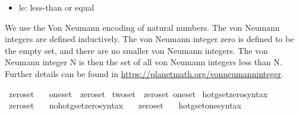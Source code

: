 \begin{isabellebody}
\begin{isamarkuptext}
\begin{itemize}
\item le: less-than or equal%
\end{itemize}%
\end{isamarkuptext}\isamarkuptrue%
%
\begin{isamarkuptext}%
We use the Von Neumann encoding of natural numbers. The von Neumann integers 
are defined inductively. The von Neumann integer zero is defined to be the empty set, 
and there are no smaller von Neumann integers. The von Neumann integer N is then the set of 
all von Neumann integers less than N. Further details can be found in
\url{https://planetmath.org/vonneumanninteger}.%
\end{isamarkuptext}\isamarkuptrue%
\isamarkupfalse%
\ {\isachardoublequoteopen}zero{\isacharunderscore}{\kern0pt}set\ {\isasymequiv}\ {\isacharbraceleft}{\kern0pt}{\isacharbraceright}{\kern0pt}{\isachardoublequoteclose}\isanewline
{}\isamarkupfalse%
\ {\isachardoublequoteopen}one{\isacharunderscore}{\kern0pt}set\ {\isasymequiv}\ {\isacharbraceleft}{\kern0pt}zero{\isacharunderscore}{\kern0pt}set{\isacharbraceright}{\kern0pt}{\isachardoublequoteclose}\isanewline
{}\isamarkupfalse%
\ {\isachardoublequoteopen}two{\isacharunderscore}{\kern0pt}set\ {\isasymequiv}\ {\isacharbraceleft}{\kern0pt}zero{\isacharunderscore}{\kern0pt}set{\isacharcomma}{\kern0pt}\ one{\isacharunderscore}{\kern0pt}set{\isacharbraceright}{\kern0pt}{\isachardoublequoteclose}\isanewline
\isanewline
{}\isamarkupfalse%
\ hotg{\isacharunderscore}{\kern0pt}set{\isacharunderscore}{\kern0pt}zero{\isacharunderscore}{\kern0pt}syntax\ \ \isamarkupfalse%
\ zero{\isacharunderscore}{\kern0pt}set\ {\isacharparenleft}{\kern0pt}{\isachardoublequoteopen}{}{\isachardoublequoteclose}{\isacharparenright}{\kern0pt}\ \isamarkupfalse%
\isanewline
{}\isamarkupfalse%
\ no{\isacharunderscore}{\kern0pt}hotg{\isacharunderscore}{\kern0pt}set{\isacharunderscore}{\kern0pt}zero{\isacharunderscore}{\kern0pt}syntax\ \ \isamarkupfalse%
\ zero{\isacharunderscore}{\kern0pt}set\ {\isacharparenleft}{\kern0pt}{\isachardoublequoteopen}{}{\isachardoublequoteclose}{\isacharparenright}{\kern0pt}\ \isamarkupfalse%
\isanewline
\isanewline
{}\isamarkupfalse%
\ hotg{\isacharunderscore}{\kern0pt}set{\isacharunderscore}{\kern0pt}one{\isacharunderscore}{\kern0pt}syntax\ \ \isamarkupfalse%

\end{isabellebody}
